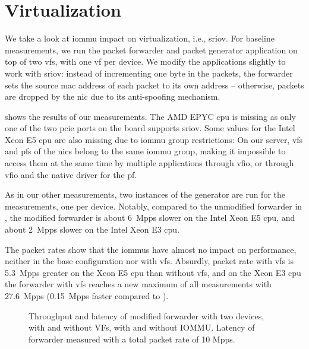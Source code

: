 \section{Virtualization}
\label{sec:virtualization}

We take a look at \ac{iommu} impact on virtualization, i.e., \ac{sriov}. For
baseline measurements, we run the packet forwarder and packet generator
application on top of two \acp{vf}, with one \ac{vf} per device. We modify the
applications slightly to work with \ac{sriov}: instead of incrementing one byte
in the packets, the forwarder sets the source \ac{mac} address of each packet to
its own address -- otherwise, packets are dropped by the \ac{nic} due to its
anti-spoofing mechanism.

 shows the results of our measurements. The AMD EPYC
\ac{cpu} is missing as only one of the two \ac{pcie} ports on the board supports
\ac{sriov}. Some values for the Intel Xeon E5 \ac{cpu} are also missing due to
\ac{iommu} group restrictions: On our server, \acp{vf} and \acp{pf} of the
\acp{nic} belong to the same \ac{iommu} group, making it impossible to access
them at the same time by multiple applications through \ac{vfio}, or through
\ac{vfio} and the native driver for the \ac{pf}.

As in our other measurements, two instances of the generator are run for the
measurements, one per device. Notably, compared to the unmodified forwarder in
, the modified forwarder is about 6~Mpps
slower on the Intel Xeon E5 \ac{cpu}, and about 2~Mpps slower on the Intel Xeon
E3 \ac{cpu}.

The packet rates show that the \acp{iommu} have almost no impact on performance,
neither in the base configuration nor with \acp{vf}. Absurdly, packet rate with
\acp{vf} is 5.3~Mpps greater on the Xeon E5 \ac{cpu} than without \acp{vf}, and
on the Xeon E3 \ac{cpu} the forwarder with \acp{vf} reaches a new maximum of all
measurements with 27.6~Mpps (0.15~Mpps faster compared to
).

\begin{figure}%
	\centering
    \par

    \caption{Throughput and latency of modified forwarder with two devices, with
    and without VFs, with and without IOMMU. Latency of forwarder measured with
    a total packet rate of 10 Mpps.}
	\label{fig:sriov-baseline}
\end{figure}

